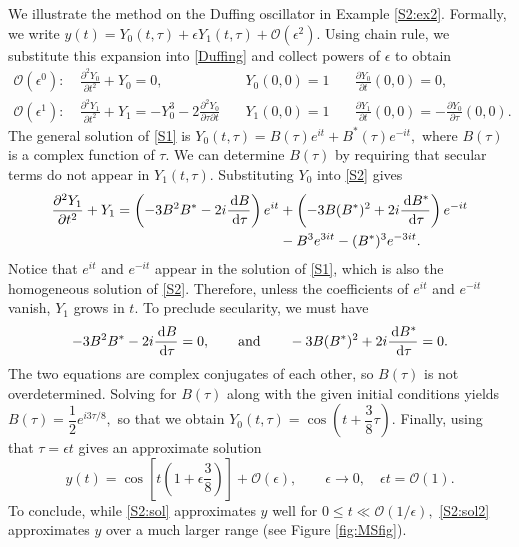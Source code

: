 We illustrate the method on the Duffing oscillator in Example \ref{S2:ex2}. Formally, we write $y(t) = Y_0(t, \tau) + \epsilon Y_1(t, \tau) + \mathcal{O}(\epsilon^2).$ 
Using chain rule, we substitute this expansion into \eqref{Duffing} and collect powers of $\epsilon$ to obtain
\begin{align}
\mathcal{O}(\epsilon^0): ~ &\frac{\partial^2 Y_0}{\partial t^2} + Y_0 = 0, \quad &Y_0(0,0) = 1 \quad &\frac{\partial Y_0}{\partial t}(0,0) = 0, \label{S1} \\
\mathcal{O}(\epsilon^1): ~ &\frac{\partial^2 Y_1}{\partial t^2} + Y_1 = - Y_0^3 - 2 \frac{\partial^2 Y_0}{\partial \tau \partial t} \quad &Y_1(0,0) = 1 \quad &\frac{\partial Y_1}{\partial t}(0,0) = -\frac{\partial Y_0}{\partial \tau}(0,0). \label{S2}
\end{align}
The general solution of \eqref{S1} is $Y_0(t, \tau) = B(\tau) e^{it} + B^*(\tau) e^{-it},$ where $B(\tau)$ is a complex function of $\tau$. We can determine $B(\tau)$ by requiring that secular terms do not appear in $Y_1(t, \tau).$ Substituting $Y_0$ into \eqref{S2} gives
\begin{equation}\label{S4}
\begin{aligned}
\frac{\partial^2 Y_1}{\partial t^2} + Y_1 =  \left(-3 B^2 B^* - 2i \frac{\,\mathrm{d} B}{\,\mathrm{d} \tau}\right) e^{it} &+ \left(-3 B (B^*)^2 + 2i \frac{\,\mathrm{d} B^*}{\,\mathrm{d} \tau}\right) e^{-it}\\
&- B^3 e^{3it}  - (B^*)^3 e^{-3it}.
\end{aligned}
\end{equation}
Notice that $e^{it}$ and $e^{-it}$ appear in the solution of \eqref{S1}, which is also the homogeneous solution of \eqref{S2}. Therefore, unless the coefficients of $e^{it}$ and $e^{-it}$ vanish, $Y_1$ grows in $t.$  To preclude secularity, we must have
\[
-3 B^2 B^* - 2i \frac{\,\mathrm{d} B}{\,\mathrm{d} \tau} = 0, \qquad \text{and} \qquad -3 B (B^*)^2 + 2i \frac{\,\mathrm{d} B^*}{\,\mathrm{d} \tau} = 0.
\]
The two equations are complex conjugates of each other, so $B(\tau)$ is not overdetermined. Solving for $B(\tau)$ along with the given initial conditions yields $B(\tau) = \dfrac{1}{2} e^{i3\tau/8},$ so that we obtain $Y_0(t, \tau) = \cos \left(t + \dfrac{3}{8}\tau\right).$ Finally, using that $\tau = \epsilon t$ gives an approximate solution 
\begin{equation}\label{S2:sol2}
y(t) = \cos \left[ t\left(1 + \epsilon\frac{3}{8}\right)\right] + \mathcal{O}(\epsilon), \qquad \epsilon \to 0, \quad \epsilon t = \mathcal{O}(1).
\end{equation}
To conclude, while \eqref{S2:sol} approximates $y$ well for $0\leq t \ll \mathcal{O}(1/\epsilon),$ \eqref{S2:sol2} approximates $y$ over a much larger range (see Figure \ref{fig:MSfig}). 

